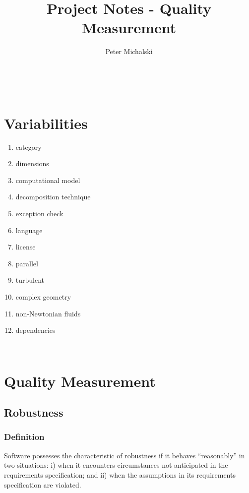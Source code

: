 \documentclass{article}
\title{Project Notes - Quality Measurement}
\author{Peter Michalski}
\date{}
\begin{document}
\maketitle


\newpage

\tableofcontents
{}

~\newpage
\section{Variabilities}

\begin{enumerate}
	\item category
	\item dimensions
	\item computational model
	\item decomposition technique
	\item exception check
	\item language
	\item license
	\item parallel
	\item turbulent
	\item complex geometry
	\item non-Newtonian fluids
	\item dependencies
\end{enumerate}

~\newpage
\section{Quality Measurement}
\subsection{Robustness}
\subsubsection{Definition}
Software possesses the characteristic of robustness if it behaves ``reasonably'' in two situations: i) when it encounters circumstances not anticipated in the requirements specification; and ii) when the assumptions in its requirements specification are violated.
\end{document}
